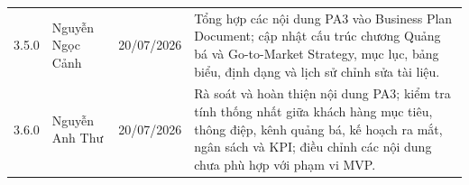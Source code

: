 \documentclass[12pt,a4paper]{article}
\begin{document}
\begin{longtable}{@{}L{1.8cm}L{3.0cm}L{2.3cm}L{8.8cm}@{}}
3.5.0 &
Nguyễn Ngọc Cảnh &
20/07/2026 &
Tổng hợp các nội dung PA3 vào Business Plan Document; cập nhật cấu trúc chương Quảng bá và Go-to-Market Strategy, mục lục, bảng biểu, định dạng và lịch sử chỉnh sửa tài liệu. \\

3.6.0 &
Nguyễn Anh Thư &
20/07/2026 &
Rà soát và hoàn thiện nội dung PA3; kiểm tra tính thống nhất giữa khách hàng mục tiêu, thông điệp, kênh quảng bá, kế hoạch ra mắt, ngân sách và KPI; điều chỉnh các nội dung chưa phù hợp với phạm vi MVP. \\

\end{longtable}

\endgroup
\newpage

\tableofcontents
\newpage

\listoffigures
\newpage

\listoftables
\newpage

\newpage
\newpage
\newpage
\end{document}
